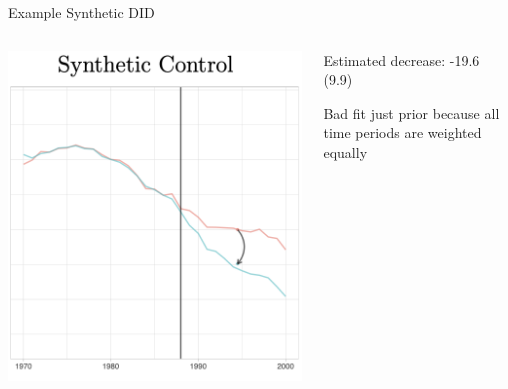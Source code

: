 \documentclass[t]{beamer}
\begin{document}
\begin{frame}{Example Synthetic DID}
  \begin{columns}[T]
    \begin{column}{.65\textwidth}
      \includegraphics[width=\textwidth]{lecture_includes/sdid_1.png}
    \end{column}
    \hfill
    \begin{column}{.3\textwidth}
      Estimated decrease: -19.6 (9.9)

      \bigskip Bad fit just prior because all time periods are weighted equally
    \end{column}
  \end{columns}
\end{frame}
\end{document}
